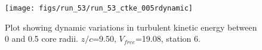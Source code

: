 \begin{figure}[H]
\centering
\texttt{[image: figs/run\_53/run\_53\_ctke\_005rdynamic]}
\caption{Plot showing dynamic variations in turbulent kinetic energy between 0 and 0.5 core radii. $z/c$=9.50, $V_{free}$=19.08, station 6.}
\label{fig:run_53_ctke_005rdynamic}
\end{figure}


